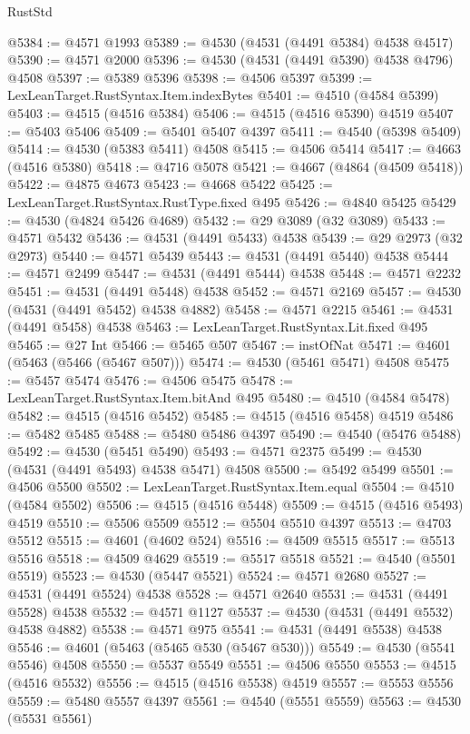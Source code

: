\begin{lexlean}{RustStd}
\begin{coremodule}
@5384 := @4571 @1993
@5389 := @4530 (@4531 (@4491 @5384) @4538 @4517)
@5390 := @4571 @2000
@5396 := @4530 (@4531 (@4491 @5390) @4538 @4796) @4508
@5397 := @5389 @5396
@5398 := @4506 @5397
@5399 := LexLeanTarget.RustSyntax.Item.indexBytes
@5401 := @4510 (@4584 @5399)
@5403 := @4515 (@4516 @5384)
@5406 := @4515 (@4516 @5390) @4519
@5407 := @5403 @5406
@5409 := @5401 @5407 @4397
@5411 := @4540 (@5398 @5409)
@5414 := @4530 (@5383 @5411) @4508
@5415 := @4506 @5414
@5417 := @4663 (@4516 @5380)
@5418 := @4716 @5078
@5421 := @4667 (@4864 (@4509 @5418))
@5422 := @4875 @4673
@5423 := @4668 @5422
@5425 := LexLeanTarget.RustSyntax.RustType.fixed @495
@5426 := @4840 @5425
@5429 := @4530 (@4824 @5426 @4689)
@5432 := @29 @3089 (@32 @3089)
@5433 := @4571 @5432
@5436 := @4531 (@4491 @5433) @4538
@5439 := @29 @2973 (@32 @2973)
@5440 := @4571 @5439
@5443 := @4531 (@4491 @5440) @4538
@5444 := @4571 @2499
@5447 := @4531 (@4491 @5444) @4538
@5448 := @4571 @2232
@5451 := @4531 (@4491 @5448) @4538
@5452 := @4571 @2169
@5457 := @4530 (@4531 (@4491 @5452) @4538 @4882)
@5458 := @4571 @2215
@5461 := @4531 (@4491 @5458) @4538
@5463 := LexLeanTarget.RustSyntax.Lit.fixed @495
@5465 := @27 Int
@5466 := @5465 @507
@5467 := instOfNat
@5471 := @4601 (@5463 (@5466 (@5467 @507)))
@5474 := @4530 (@5461 @5471) @4508
@5475 := @5457 @5474
@5476 := @4506 @5475
@5478 := LexLeanTarget.RustSyntax.Item.bitAnd @495
@5480 := @4510 (@4584 @5478)
@5482 := @4515 (@4516 @5452)
@5485 := @4515 (@4516 @5458) @4519
@5486 := @5482 @5485
@5488 := @5480 @5486 @4397
@5490 := @4540 (@5476 @5488)
@5492 := @4530 (@5451 @5490)
@5493 := @4571 @2375
@5499 := @4530 (@4531 (@4491 @5493) @4538 @5471) @4508
@5500 := @5492 @5499
@5501 := @4506 @5500
@5502 := LexLeanTarget.RustSyntax.Item.equal
@5504 := @4510 (@4584 @5502)
@5506 := @4515 (@4516 @5448)
@5509 := @4515 (@4516 @5493) @4519
@5510 := @5506 @5509
@5512 := @5504 @5510 @4397
@5513 := @4703 @5512
@5515 := @4601 (@4602 @524)
@5516 := @4509 @5515
@5517 := @5513 @5516
@5518 := @4509 @4629
@5519 := @5517 @5518
@5521 := @4540 (@5501 @5519)
@5523 := @4530 (@5447 @5521)
@5524 := @4571 @2680
@5527 := @4531 (@4491 @5524) @4538
@5528 := @4571 @2640
@5531 := @4531 (@4491 @5528) @4538
@5532 := @4571 @1127
@5537 := @4530 (@4531 (@4491 @5532) @4538 @4882)
@5538 := @4571 @975
@5541 := @4531 (@4491 @5538) @4538
@5546 := @4601 (@5463 (@5465 @530 (@5467 @530)))
@5549 := @4530 (@5541 @5546) @4508
@5550 := @5537 @5549
@5551 := @4506 @5550
@5553 := @4515 (@4516 @5532)
@5556 := @4515 (@4516 @5538) @4519
@5557 := @5553 @5556
@5559 := @5480 @5557 @4397
@5561 := @4540 (@5551 @5559)
@5563 := @4530 (@5531 @5561)

\end{coremodule}
\end{lexlean}
